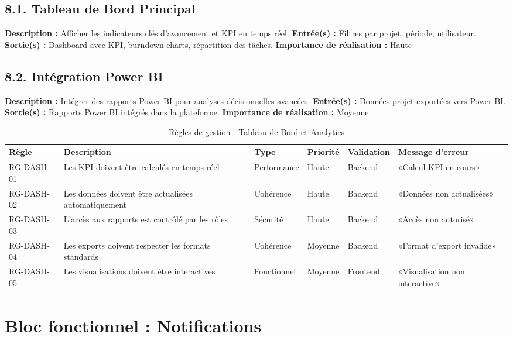 \subsection{8.1. Tableau de Bord Principal}
\textbf{Description :} Afficher les indicateurs clés d'avancement et KPI en temps réel.
\textbf{Entrée(s) :} Filtres par projet, période, utilisateur.
\textbf{Sortie(s) :} Dashboard avec KPI, burndown charts, répartition des tâches.
\textbf{Importance de réalisation :} Haute

\subsection{8.2. Intégration Power BI}
\textbf{Description :} Intégrer des rapports Power BI pour analyses décisionnelles avancées.
\textbf{Entrée(s) :} Données projet exportées vers Power BI.
\textbf{Sortie(s) :} Rapports Power BI intégrés dans la plateforme.
\textbf{Importance de réalisation :} Moyenne

\begin{table}[H]
\centering
\footnotesize
\begin{tabular}{|p{1.5cm}|p{3.5cm}|p{1.5cm}|p{1.5cm}|p{2cm}|p{2.5cm}|}
\hline
\textbf{Règle} & \textbf{Description} & \textbf{Type} & \textbf{Priorité} & \textbf{Validation} & \textbf{Message d'erreur} \\
\hline
RG-DASH-01 & Les KPI doivent être calculés en temps réel & Performance & Haute & Backend & «Calcul KPI en cours» \\
\hline
RG-DASH-02 & Les données doivent être actualisées automatiquement & Cohérence & Haute & Backend & «Données non actualisées» \\
\hline
RG-DASH-03 & L'accès aux rapports est contrôlé par les rôles & Sécurité & Haute & Backend & «Accès non autorisé» \\
\hline
RG-DASH-04 & Les exports doivent respecter les formats standards & Cohérence & Moyenne & Backend & «Format d'export invalide» \\
\hline
RG-DASH-05 & Les visualisations doivent être interactives & Fonctionnel & Moyenne & Frontend & «Visualisation non interactive» \\
\hline
\end{tabular}
\caption{Règles de gestion - Tableau de Bord et Analytics}
\label{tab:rg_dashboard}
\end{table}

\section{Bloc fonctionnel : Notifications}

